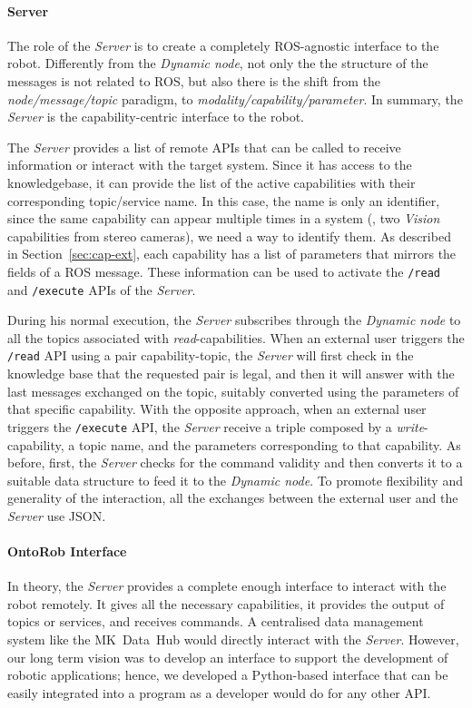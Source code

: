 \paragraph{Server} The role of the \textit{Server} is to create a completely ROS-agnostic interface to the robot. Differently from the \textit{Dynamic node}, not only the the structure of the messages is not related to ROS, but also there is the shift from the \textit{node/message/topic} paradigm, to \textit{modality/capability/parameter}. In summary, the \textit{Server} is the capability-centric interface to the robot.

The \textit{Server} provides a list of remote APIs that can be called to receive information or interact with the target system. Since it has access to the knowledgebase, it can provide the list of the active capabilities with their corresponding topic/service name. In this case, the name is only an identifier, since the same capability can appear multiple times in a system (\eg, two \textit{Vision} capabilities from stereo cameras), we need a way to identify them. As described in Section~\ref{sec:cap-ext}, each capability has a list of parameters that mirrors the fields of a ROS message. These information can be used to activate the \texttt{/read} and \texttt{/execute} APIs of the \textit{Server}.

During his normal execution, the \textit{Server} subscribes through the \textit{Dynamic node} to all the topics associated with \textit{read}-capabilities. When an external user triggers the \texttt{/read} API using a pair capability-topic, the \textit{Server} will first check in the knowledge base that the requested pair is legal, and then it will answer with the last messages exchanged on the topic, suitably converted using the parameters of that specific capability. With the opposite approach, when an external user triggers the \texttt{/execute} API, the \textit{Server} receive a triple composed by a \textit{write}-capability, a topic name, and the parameters corresponding to that capability. As before, first, the \textit{Server} checks for the command validity and then converts it to a suitable data structure to feed it to the \textit{Dynamic node}. To promote flexibility and generality of the interaction, all the exchanges between the external user and the \textit{Server} use JSON.

\paragraph{OntoRob Interface} In theory, the \textit{Server} provides a complete enough interface to interact with the robot remotely. It gives all the necessary capabilities, it provides the output of topics or services, and receives commands. A centralised data management system like the MK~Data~Hub would directly interact with the \textit{Server}. However, our long term vision was to develop an interface to support the development of robotic applications; hence, we developed a Python-based interface that can be easily integrated into a program as a developer would do for any other API.

